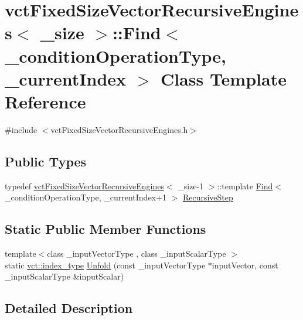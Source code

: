 \hypertarget{classvct_fixed_size_vector_recursive_engines_1_1_find}{}\section{vct\+Fixed\+Size\+Vector\+Recursive\+Engines$<$ \+\_\+size $>$\+:\+:Find$<$ \+\_\+condition\+Operation\+Type, \+\_\+current\+Index $>$ Class Template Reference}
\label{classvct_fixed_size_vector_recursive_engines_1_1_find}


{\ttfamily \#include $<$vct\+Fixed\+Size\+Vector\+Recursive\+Engines.\+h$>$}

\subsection*{Public Types}
\begin{DoxyCompactItemize}
\item 
typedef \hyperlink{classvct_fixed_size_vector_recursive_engines}{vct\+Fixed\+Size\+Vector\+Recursive\+Engines}$<$ \+\_\+size-\/1 $>$\+::template \hyperlink{classvct_fixed_size_vector_recursive_engines_1_1_find}{Find}$<$ \+\_\+condition\+Operation\+Type, \+\_\+current\+Index+1 $>$ \hyperlink{classvct_fixed_size_vector_recursive_engines_1_1_find_aae2588d04bd3f2f1cd9daff01c63f334}{Recursive\+Step}
\end{DoxyCompactItemize}
\subsection*{Static Public Member Functions}
\begin{DoxyCompactItemize}
\item 
{\footnotesize template$<$class \+\_\+input\+Vector\+Type , class \+\_\+input\+Scalar\+Type $>$ }\\static \hyperlink{namespacevct_a50405d87494dce1f22ee3930ca285ee9}{vct\+::index\+\_\+type} \hyperlink{classvct_fixed_size_vector_recursive_engines_1_1_find_a89ea50c19849424df4e14b9a7f63a74d}{Unfold} (const \+\_\+input\+Vector\+Type $\ast$input\+Vector, const \+\_\+input\+Scalar\+Type \&input\+Scalar)
\end{DoxyCompactItemize}


\subsection{Detailed Description}
